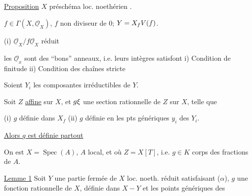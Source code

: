 \uline{Proposition} $X$ préschéma loc. noethérien .

$f\in\Gamma(X,\underline{\mathcal O}_X)$, $f$ non diviseur de 0; $Y=X_fV(f)$.

(i) $\underline{\mathcal O}_X/f\underline{\mathcal O}_X$ réduit

  les $\underline{\mathcal O}_x$ sont des ``bons'' anneaux, i.e. leurs  intègres satisfont i) Condition de finitude ii) Condition des chaînes stricte

Soient $Y_i$ les composantes irréductibles de $Y$.

Soit $Z$ \uline{affine} sur $X$, et $g\xi$ une section rationnelle de $Z$ sur $X$, telle que

(i) $g$ définie dans $X_f$ (ii) $g$ définie en les pts génériques $y_i$ des $Y_i$.

\uline{Alors $g$ est définie partout}

On est  $X=\operatorname{Spec}(A)$, $A$ local, et où $Z=X[T]$, i.e. $g\in K$ corps des fractions de $A$.

\uline{Lemme 1} Soit $Y$ une partie fermée de $X$ loc. noeth. réduit satisfaisant ($\alpha$),  $g$ une  fonction rationnelle de $X$, définie dans $X-Y$ et les points génériques des
